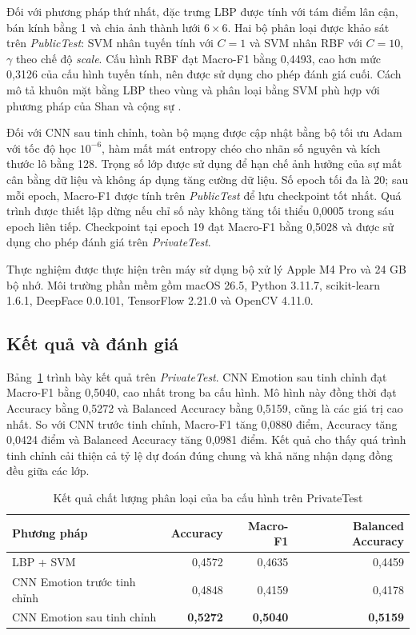 \documentclass[../LuanVan.tex]{subfiles}
\begin{document}
Đối với phương pháp thứ nhất, đặc trưng LBP được tính với tám điểm lân cận, bán kính bằng 1 và chia ảnh thành lưới $6\times6$. Hai bộ phân loại được khảo sát trên \textit{PublicTest}: SVM nhân tuyến tính với $C=1$ và SVM nhân RBF với $C=10$, $\gamma$ theo chế độ \textit{scale}. Cấu hình RBF đạt Macro-F1 bằng 0,4493, cao hơn mức 0,3126 của cấu hình tuyến tính, nên được sử dụng cho phép đánh giá cuối. Cách mô tả khuôn mặt bằng LBP theo vùng và phân loại bằng SVM phù hợp với phương pháp của Shan và cộng sự \cite{shan2009lbp}.

Đối với CNN sau tinh chỉnh, toàn bộ mạng được cập nhật bằng bộ tối ưu Adam với tốc độ học $10^{-6}$, hàm mất mát entropy chéo cho nhãn số nguyên và kích thước lô bằng 128. Trọng số lớp được sử dụng để hạn chế ảnh hưởng của sự mất cân bằng dữ liệu và không áp dụng tăng cường dữ liệu. Số epoch tối đa là 20; sau mỗi epoch, Macro-F1 được tính trên \textit{PublicTest} để lưu checkpoint tốt nhất. Quá trình được thiết lập dừng nếu chỉ số này không tăng tối thiểu 0,0005 trong sáu epoch liên tiếp. Checkpoint tại epoch 19 đạt Macro-F1 bằng 0,5028 và được sử dụng cho phép đánh giá trên \textit{PrivateTest}.

Thực nghiệm được thực hiện trên máy sử dụng bộ xử lý Apple M4 Pro và 24 GB bộ nhớ. Môi trường phần mềm gồm macOS 26.5, Python 3.11.7, scikit-learn 1.6.1, DeepFace 0.0.101, TensorFlow 2.21.0 và OpenCV 4.11.0.

\subsection{Kết quả và đánh giá}
\label{subsection:5.2.4}

Bảng~\ref{tab:fer_overall_results_ch5} trình bày kết quả trên \textit{PrivateTest}. CNN Emotion sau tinh chỉnh đạt Macro-F1 bằng 0,5040, cao nhất trong ba cấu hình. Mô hình này đồng thời đạt Accuracy bằng 0,5272 và Balanced Accuracy bằng 0,5159, cũng là các giá trị cao nhất. So với CNN trước tinh chỉnh, Macro-F1 tăng 0,0880 điểm, Accuracy tăng 0,0424 điểm và Balanced Accuracy tăng 0,0981 điểm. Kết quả cho thấy quá trình tinh chỉnh cải thiện cả tỷ lệ dự đoán đúng chung và khả năng nhận dạng đồng đều giữa các lớp.

\begin{table}[H]
    \centering
    \caption{Kết quả chất lượng phân loại của ba cấu hình trên PrivateTest}
    \label{tab:fer_overall_results_ch5}
    \begin{tabular}{|l|r|r|r|}
        \hline
        \textbf{Phương pháp} & \textbf{Accuracy} & \textbf{Macro-F1} & \textbf{Balanced Accuracy} \\
        \hline
        LBP + SVM & 0,4572 & 0,4635 & 0,4459 \\
        \hline
        CNN Emotion trước tinh chỉnh & 0,4848 & 0,4159 & 0,4178 \\
        \hline
        CNN Emotion sau tinh chỉnh & \textbf{0,5272} & \textbf{0,5040} & \textbf{0,5159} \\
        \hline
    \end{tabular}
\end{table}
\end{document}
